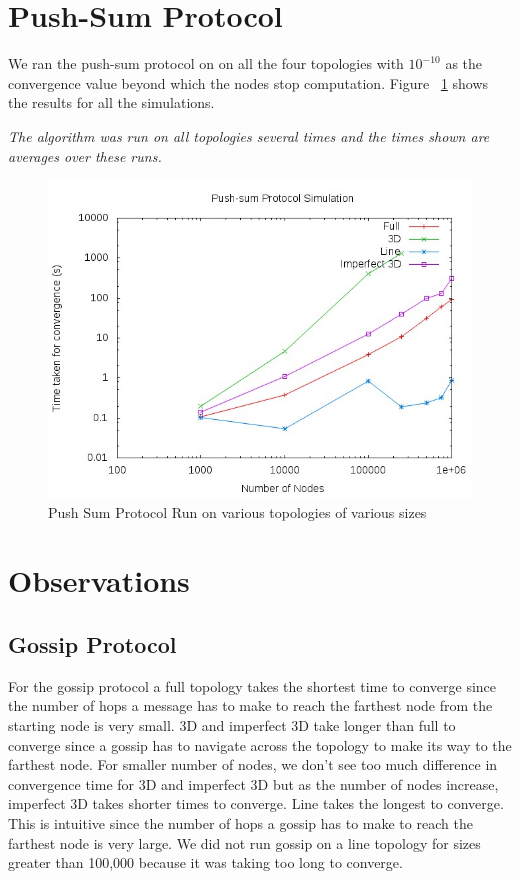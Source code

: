 \documentclass[11pt]{article}
\begin{document}
\section{Push-Sum Protocol}
We ran the push-sum protocol on on all the four topologies with $10^{-10}$ as the convergence value beyond which the nodes stop computation. Figure ~\ref{pushsumresults} shows the results for all the simulations. 

\textit{The algorithm was run on all topologies several times and the times shown are averages over these runs.}
\begin{figure}[h]
    \includegraphics[scale=0.75]{pushsum.jpg}
    \caption{Push Sum Protocol Run on various topologies of various sizes}
    \label{pushsumresults}
\end{figure}



\section{Observations}
\subsection{Gossip Protocol}
For the gossip protocol a full topology takes the shortest time to converge since the number of hops a message has to make to reach the farthest node from the starting node is very small. 3D and imperfect 3D take longer than full to converge since a gossip has to navigate across the topology to make its way to the farthest node. For smaller number of nodes, we don't see too much difference in convergence time for 3D and imperfect 3D but as the number of nodes increase, imperfect 3D takes shorter times to converge. Line takes the longest to converge. This is intuitive since the number of hops a gossip has to make to reach the farthest node is very large. We did not run gossip on a line topology for sizes greater than 100,000 because it was taking too long to converge.
\end{document}
